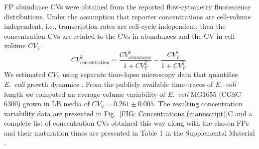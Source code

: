 \documentclass[%
 reprint,prx,
superscriptaddress,
%
%
%
%
%
%
%
%
%
 amsmath,amssymb,
 aps,
%
%
%
%
%
%
]{revtex4-2}
\begin{document}
{{FP abundance CVs were obtained from the reported flow-cytometry fluorescence distributions. Under the assumption that reporter concentrations are cell-volume independent, i.e., transcription rates are cell-cycle independent, then the concentration CVs are related to the CVs in abundances and the CV in cell volume $CV_{V}$ \cite{galbusera2020using} 
\begin{equation}
    CV_{\text{concentration}}^{2} = \frac{CV_{\text{abundance}}^{2}}{1 + CV_{V}^{2}} - \frac{CV_{V}^{2}}{1 + CV_{V}^{2}}.
    \label{EQ: Appendix concentration CVs from abundance CVs (manuscript)}
\end{equation}
%
%
We estimated $CV_{V}$ using separate time-lapse microscopy data that quantifies \emph{E.~coli} growth dynamics \cite{wang2010robust}.
%
From the publicly available time-traces of \emph{E.~coli} length we computed 
%
%
an average volume variability of \emph{E.~coli} MG1655 (CGSC 6300) grown in LB media of \mbox{$CV_{V} = 0.261\pm0.005$}. The resulting concentration variability data are presented in Fig.~\ref{FIG: Concentrations (manuscript)}C and a complete list of concentration CVs obtained this way along with the chosen FPs and their maturation times are presented in Table 1 in the Supplemental Material \cite{SI}.











}}
\end{document}
